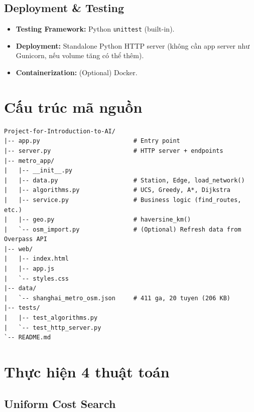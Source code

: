 \subsection{Deployment \& Testing}

\begin{itemize}
  \item \textbf{Testing Framework:} Python \texttt{unittest} (built-in).
  \item \textbf{Deployment:} Standalone Python HTTP server (không cần app server như Gunicorn, nếu volume tăng có thể thêm).
  \item \textbf{Containerization:} (Optional) Docker.
\end{itemize}

\section{Cấu trúc mã nguồn}

\begin{lstlisting}[caption=Cấu trúc thư mục project]
Project-for-Introduction-to-AI/
|-- app.py                          # Entry point
|-- server.py                       # HTTP server + endpoints
|-- metro_app/
|   |-- __init__.py
|   |-- data.py                     # Station, Edge, load_network()
|   |-- algorithms.py               # UCS, Greedy, A*, Dijkstra
|   |-- service.py                  # Business logic (find_routes, etc.)
|   |-- geo.py                      # haversine_km()
|   `-- osm_import.py               # (Optional) Refresh data from Overpass API
|-- web/
|   |-- index.html
|   |-- app.js
|   `-- styles.css
|-- data/
|   `-- shanghai_metro_osm.json     # 411 ga, 20 tuyen (206 KB)
|-- tests/
|   |-- test_algorithms.py
|   `-- test_http_server.py
`-- README.md
\end{lstlisting}

\section{Thực hiện 4 thuật toán}

\subsection{Uniform Cost Search}

